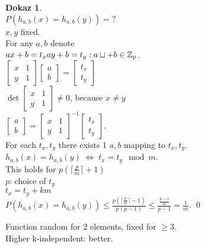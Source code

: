 \documentclass[a4paper, 12pt]{book}
\theoremstyle{definition}
\newtheorem{pro}[counter]{Dokaz}
\theoremstyle{remark}
\newcommand{\Z}{\mathbb{Z}}
\begin{document}
\begin{pro} \text{} \\
  $P(h_{a,b}(x) = h_{a,b}(y)) = ?$ \\
  $x, y$ fixed. \\
  For any $a, b$ denote \\
  $ax + b = t_x \\
  ay + b = t_y: \\
  a \sqcup + b \in \Z_p$. \\
  $\begin{bmatrix}x & 1 \\ y & 1\end{bmatrix} \begin{bmatrix}a \\b\end{bmatrix} =
  \begin{bmatrix}t_x \\ t_y\end{bmatrix}$ \\
  $\det \begin{bmatrix}x & 1 \\ y & 1\end{bmatrix} \neq 0$, because $x \neq y$ \\
  $\begin{bmatrix}a \\b\end{bmatrix} = \begin{bmatrix}x & 1 \\ y & 1\end{bmatrix}^{-1}
  \begin{bmatrix}t_x \\ t_y\end{bmatrix}$. \\
  For each $t_x, t_y$ there exists 1 $a, b$ mapping to $t_x, t_y$. \\
  $h_{a,b}(x) = h_{a,b}(y) \; \iff \; t_x = t_y \mod m$. \\
  This holds for $p\left(\lceil\frac{p}{m}\rceil + 1\right)$ \\
  $p$: choice of $t_y$ \\
  $t_x = t_y + km$ \\
  $P\left(h_{a,b}(x) = h_{a,b}(y)\right) \leq \frac{p\left(\lceil\frac{p}{m}\rceil-1\right)}{p(p-1)}
  \leq \frac{\frac{p-1}{m}}{p-1} = \frac{1}{m}$.
  \qed
\end{pro}
Function random for $2$ elements, fixed for $\geq 3$. \\
Higher k-independent: better.
\end{document}
